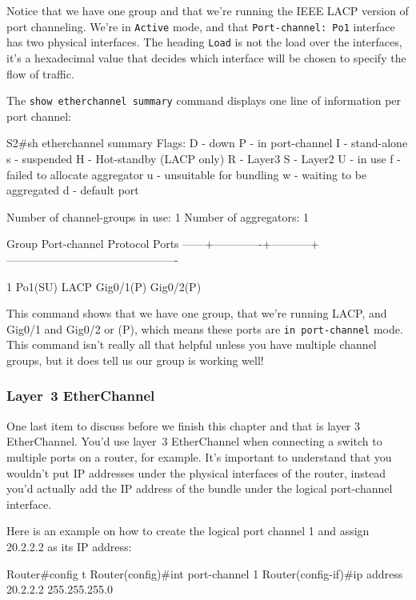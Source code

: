 Notice that we have one group and that we're running the IEEE LACP
version of port channeling. We're in \texttt{Active} mode, and that
\texttt{Port-channel:\ Po1} interface has two physical interfaces. The
heading \texttt{Load} is not the load over the interfaces, it's a
hexadecimal value that decides which interface will be chosen to specify
the flow of traffic.

The \texttt{show\ etherchannel\ summary} command displays one line of
information per port channel:

\begin{cli}
S2#sh etherchannel summary
Flags:  D - down        P - in port-channel
        I - stand-alone s - suspended
        H - Hot-standby (LACP only)
        R - Layer3      S - Layer2
        U - in use      f - failed to allocate aggregator
        u - unsuitable for bundling
        w - waiting to be aggregated
        d - default port
 
Number of channel-groups in use: 1
Number of aggregators:           1
 
Group  Port-channel  Protocol    Ports
------+-------------+-----------+----------------------------------------------
 
1      Po1(SU)           LACP   Gig0/1(P) Gig0/2(P)
\end{cli}

This command shows that we have one group, that we're running LACP, and
Gig0/1 and Gig0/2 or (P), which means these ports are
\texttt{in\ port-channel} mode. This command isn't really all that
helpful unless you have multiple channel groups, but it does tell us our
group is working well!

\subsubsection{Layer~3 EtherChannel}

One last item to discuss before we finish this chapter and that is layer
3 EtherChannel. You'd use layer~3 EtherChannel when connecting a switch
to multiple ports on a router, for example. It's important to understand
that you wouldn't put IP addresses under the physical interfaces
of the router, instead you'd actually add the IP address of the bundle
under the logical port-channel interface.

Here is an example on how to create the logical port channel 1 and
assign 20.2.2.2 as its IP address:

\begin{cli}
Router#config t
Router(config)#int port-channel 1
Router(config-if)#ip address 20.2.2.2 255.255.255.0
\end{cli}

